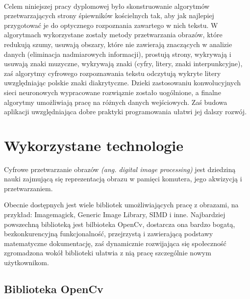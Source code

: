 \documentclass[a4paper,12pt]{article}
\begin{document}
			\paragraph{\indent} Celem niniejszej pracy dyplomowej było skonstruowanie algorytmów przetwarzających strony śpiewników kościelnych tak, 
				aby jak najlepiej przygotować je do optycznego rozpoznania zawartego w nich tekstu. W algorytmach wykorzystane zostały metody przetwarzania obrazów, 
				które redukują szumy, usuwają obszary, które nie zawierają znaczących w analizie danych (eliminacja nadmiarowych informacji), 
				prostują strony, wykrywają i usuwają znaki muzyczne, wykrywają znaki (cyfry, litery, znaki interpunkcyjne), 
				zaś algorytmy cyfrowego rozpoznawania tekstu odczytują wykryte litery uwzględniając polskie znaki diakrytyczne. 
				Dzieki zastosowaniu konwolucyjnych sieci neuronowych wypracowane rozwiąznie zostało uogólnione, a finalne algorytmy umożliwiają pracę 
				na różnych danych wejściowych. Zaś budowa aplikacji uwzględniająca dobre praktyki programowania ułatwi jej dalszy rozwój. 
	\newpage 

	\section{Wykorzystane technologie}
	    \paragraph{\indent} Cyfrowe przetwarzanie obrazów \textit{(ang. digital image processing)} jest dziedziną nauki 
			zajmującą się reprezentacją obrazu w pamięci komutera, jego akwizycją i przetwarzaniem. 
        \par Obecnie dostępnych jest wiele bibliotek umożliwiających pracę z obrazami, na przykład: Imagemagick, Generic Image Library, SIMD i inne. 
			Najbardziej powszechną biblioteką jest bilbioteka OpenCv, dostarcza ona bardzo bogatą, bezkonkurencyjną funkcjonalność, przejrzystą 
			i zawierającą podstawy matematyczne dokumentację, zaś dynamicznie rozwijająca się społeczność zgromadzona wokół biblioteki ułatwia 
			z nią pracę szczególnie nowym użytkownikom.
	    
		\subsection{Biblioteka OpenCv}
\end{document}
